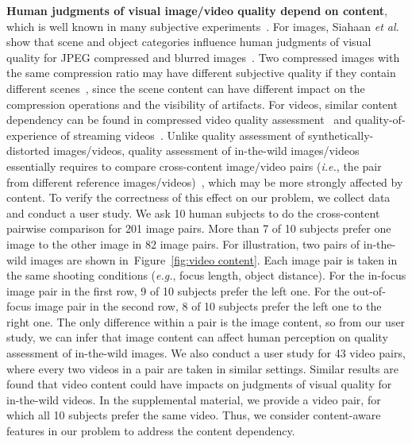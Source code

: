 \documentclass[sigconf]{acmart}
\begin{document}
\textbf{Human judgments of visual image/video quality depend on content}, which is well known in many subjective experiments~\cite{siahaan2018semantic,triantaphillidou2007image,wang2017videoset,bampis2017study,duanmu2017quality,zhang2018unreasonable,mirkovic2014evaluating}. 
For images, Siahaan \textit{et al.} show that scene and object categories influence human judgments of visual quality for JPEG compressed and blurred images~\cite{siahaan2018semantic}.
Two compressed images with the same compression ratio may have different subjective quality if they contain different scenes~\cite{triantaphillidou2007image}, since the scene content can have different impact on the compression operations and the visibility of artifacts. 
For videos, similar content dependency can be found in compressed video quality assessment~\cite{wang2017videoset,mirkovic2014evaluating} and quality-of-experience of streaming videos~\cite{bampis2017study,duanmu2017quality}.
Unlike quality assessment of synthetically-distorted images/videos, quality assessment of in-the-wild images/videos essentially requires to compare cross-content image/video pairs (\textit{i.e.}, the pair from different reference images/videos)~\cite{mikhailiuk2018psychometric}, which may be more strongly affected by content.
To verify the correctness of this effect on our problem, we collect data and conduct a user study. 
We ask 10 human subjects to do the cross-content pairwise comparison for 201 image pairs. 
More than 7 of 10 subjects prefer one image to the other image in 82 image pairs.
For illustration, two pairs of in-the-wild images are shown in~Figure~\ref{fig:video content}.
Each image pair is taken in the same shooting conditions (\textit{e.g.}, focus length, object distance).
For the in-focus image pair in the first row, 9 of 10 subjects prefer the left one. 
For the out-of-focus image pair in the second row, 8 of 10 subjects prefer the left one to the right one.  
The only difference within a pair is the image content, so from our user study, we can infer that image content can affect human perception on quality assessment of in-the-wild images. 
We also conduct a user study for 43 video pairs, where every two videos in a pair are taken in similar settings. Similar results are found that video content could have impacts on judgments of visual quality for in-the-wild videos. 
In the supplemental material, we provide a video pair, for which all 10 subjects prefer the same video.
Thus, we consider content-aware features in our problem to address the content dependency.
\end{document}
